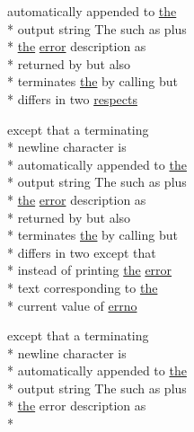 \begin{DoxyCompactItemize}
automatically appended to \hyperlink{ClientServer_2server_2Makefile_a09c6b60bb7451f9136e25140ffdff6bd}{the} \\*
output string The such as plus \\*
\hyperlink{ClientServer_2server_2Makefile_a09c6b60bb7451f9136e25140ffdff6bd}{the} \hyperlink{common_2README_a80171b13188418b4328f9247d3aff3d2}{error} description as \\*
returned by but also \\*
terminates \hyperlink{ClientServer_2server_2Makefile_a09c6b60bb7451f9136e25140ffdff6bd}{the} by calling but \\*
differs in two \hyperlink{common_2README_a33a4706d30ee60d6fc7d0c4b387dc3b9}{respects}
\item 
except that a terminating \\*
newline character is \\*
automatically appended to \hyperlink{ClientServer_2server_2Makefile_a09c6b60bb7451f9136e25140ffdff6bd}{the} \\*
output string The such as plus \\*
\hyperlink{ClientServer_2server_2Makefile_a09c6b60bb7451f9136e25140ffdff6bd}{the} \hyperlink{common_2README_a80171b13188418b4328f9247d3aff3d2}{error} description as \\*
returned by but also \\*
terminates \hyperlink{ClientServer_2server_2Makefile_a09c6b60bb7451f9136e25140ffdff6bd}{the} by calling but \\*
differs in two except that \\*
instead of printing \hyperlink{ClientServer_2server_2Makefile_a09c6b60bb7451f9136e25140ffdff6bd}{the} \hyperlink{common_2README_a80171b13188418b4328f9247d3aff3d2}{error} \\*
text corresponding to \hyperlink{ClientServer_2server_2Makefile_a09c6b60bb7451f9136e25140ffdff6bd}{the} \\*
current value of \hyperlink{common_2README_afe75ee0c7e5a90ba6bb38426ea69b996}{errno}
\item 
except that a terminating \\*
newline character is \\*
automatically appended to \hyperlink{ClientServer_2server_2Makefile_a09c6b60bb7451f9136e25140ffdff6bd}{the} \\*
output string The such as plus \\*
\hyperlink{ClientServer_2server_2Makefile_a09c6b60bb7451f9136e25140ffdff6bd}{the} error description as \\*

\end{DoxyCompactItemize}
